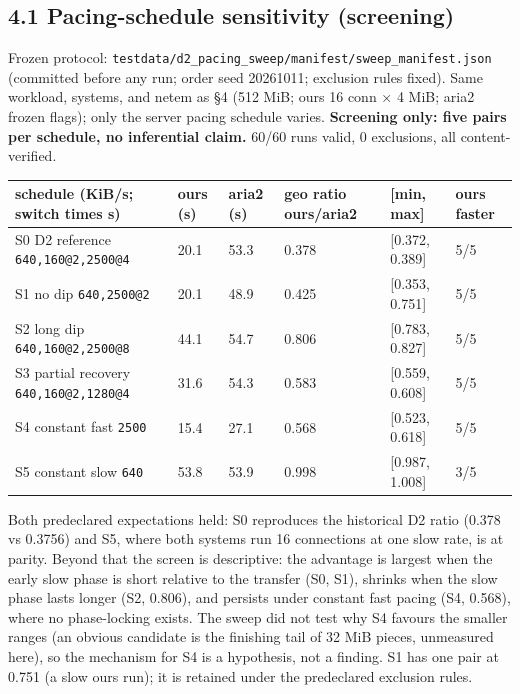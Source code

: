 \documentclass[10pt,a4paper]{article}
\begin{document}
\subsection*{4.1 Pacing-schedule sensitivity (screening)}

Frozen protocol: \texttt{testdata/\allowbreak{}d2\_pacing\_sweep/\allowbreak{}manifest/\allowbreak{}sweep\_manifest.json} (committed before any run; order seed 20261011; exclusion rules fixed). Same workload, systems, and netem as §4 (512 MiB; ours 16 conn × 4 MiB; aria2 frozen flags); only the server pacing schedule varies. \textbf{Screening only: five pairs per schedule, no inferential claim.} 60/60 runs valid, 0 exclusions, all content-verified.


{\small\begin{tabularx}{\linewidth}{@{}LLLLLL@{}}
\toprule
\textbf{schedule (KiB/s; switch times s)} & \textbf{ours (s)} & \textbf{aria2 (s)} & \textbf{geo ratio ours/aria2} & \textbf{[min, max]} & \textbf{ours faster}\\
\midrule
S0 D2 reference \texttt{640,160@2,2500@4} & 20.1 & 53.3 & 0.378 & [0.372, 0.389] & 5/5\\
S1 no dip \texttt{640,2500@2} & 20.1 & 48.9 & 0.425 & [0.353, 0.751] & 5/5\\
S2 long dip \texttt{640,160@2,2500@8} & 44.1 & 54.7 & 0.806 & [0.783, 0.827] & 5/5\\
S3 partial recovery \texttt{640,160@2,1280@4} & 31.6 & 54.3 & 0.583 & [0.559, 0.608] & 5/5\\
S4 constant fast \texttt{2500} & 15.4 & 27.1 & 0.568 & [0.523, 0.618] & 5/5\\
S5 constant slow \texttt{640} & 53.8 & 53.9 & 0.998 & [0.987, 1.008] & 3/5\\
\bottomrule
\end{tabularx}}


Both predeclared expectations held: S0 reproduces the historical D2 ratio (0.378 vs 0.3756) and S5, where both systems run 16 connections at one slow rate, is at parity. Beyond that the screen is descriptive: the advantage is largest when the early slow phase is short relative to the transfer (S0, S1), shrinks when the slow phase lasts longer (S2, 0.806), and persists under constant fast pacing (S4, 0.568), where no phase-locking exists. The sweep did not test why S4 favours the smaller ranges (an obvious candidate is the finishing tail of 32 MiB pieces, unmeasured here), so the mechanism for S4 is a hypothesis, not a finding. S1 has one pair at 0.751 (a slow ours run); it is retained under the predeclared exclusion rules.
\end{document}
